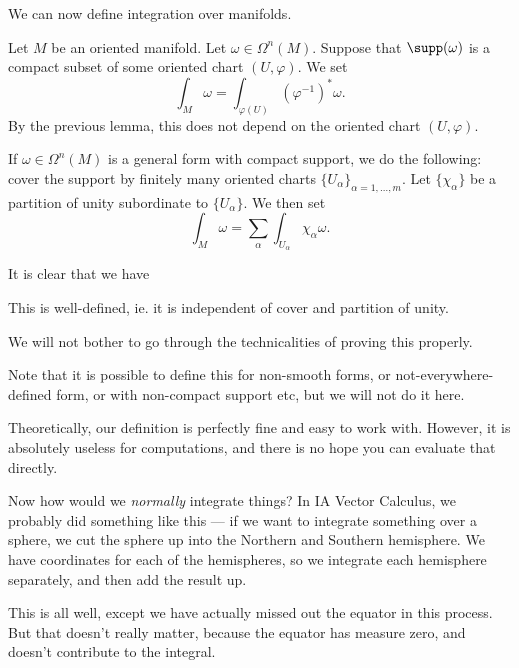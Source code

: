\documentclass[a4paper]{article}
\begin{document}
We can now define integration over manifolds.

\begin{defi}
  Let $M$ be an oriented manifold. Let $\omega \in \Omega^n(M)$. Suppose that $\supp(\omega)$ is a compact subset of some oriented chart $(U, \varphi)$. We set
  \[
    \int_M \omega = \int_{\varphi(U)} (\varphi^{-1})^* \omega.
  \]
  By the previous lemma, this does not depend on the oriented chart $(U, \varphi)$.

  If $\omega \in \Omega^n(M)$ is a general form with compact support, we do the following: cover the support by finitely many oriented charts $\{U_\alpha\}_{\alpha = 1, \ldots, m}$. Let $\{\chi_\alpha\}$ be a partition of unity subordinate to $\{U_\alpha\}$. We then set
  \[
    \int_M \omega = \sum_\alpha \int_{U_\alpha} \chi_\alpha \omega.
  \]
\end{defi}

It is clear that we have
\begin{lemma}
  This is well-defined, ie. it is independent of cover and partition of unity.
\end{lemma}
We will not bother to go through the technicalities of proving this properly.

Note that it is possible to define this for non-smooth forms, or not-everywhere-defined form, or with non-compact support etc, but we will not do it here.

Theoretically, our definition is perfectly fine and easy to work with. However, it is absolutely useless for computations, and there is no hope you can evaluate that directly.

Now how would we \emph{normally} integrate things? In IA Vector Calculus, we probably did something like this --- if we want to integrate something over a sphere, we cut the sphere up into the Northern and Southern hemisphere. We have coordinates for each of the hemispheres, so we integrate each hemisphere separately, and then add the result up.

This is all well, except we have actually missed out the equator in this process. But that doesn't really matter, because the equator has measure zero, and doesn't contribute to the integral.
\end{document}
